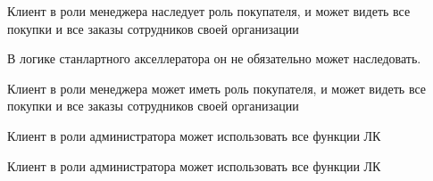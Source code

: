 {


\begin{wiki}
Клиент в роли менеджера наследует роль покупателя, и может видеть все покупки и все заказы сотрудников своей организации
\end{wiki}

\begin{teamidea}
В логике станлартного акселлератора он не обязательно может наследовать.
\end{teamidea}


\begin{itogo}
Клиент в роли менеджера может иметь роль покупателя, и может видеть все покупки и все заказы сотрудников своей организации
\end{itogo}



}



{

\begin{wiki}
Клиент в роли администратора может использовать все функции ЛК
\end{wiki}


\begin{itogo}
Клиент в роли администратора может использовать все функции ЛК
\end{itogo}
}


